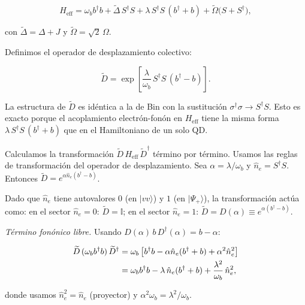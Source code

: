 \documentclass[12pt]{article}
\begin{document}
	\begin{equation}
		H_\mathrm{eff} = \omega_b b^\dagger b
		+ \widetilde\Delta\, S^\dagger S
		+ \lambda\, S^\dagger S\,(b^\dagger + b)
		+ \widetilde\Omega\bigl(S + S^\dagger\bigr),
		\label{eq:H_eff_II}
	\end{equation}
	
	con $\widetilde\Delta = \Delta + J$ y $\widetilde\Omega = \sqrt{2}\,\Omega$.
	
	\medskip
	\noindent
	Definimos el operador de desplazamiento colectivo:
	
	\begin{equation}
		\widetilde{D} = \exp\!\left[\frac{\lambda}{\omega_b}\,S^\dagger S
		\,(b^\dagger - b)\right].
		\label{eq:D_tilde}
	\end{equation}
	
	\noindent
	La estructura de $\widetilde{D}$ es id\'entica a la de Bin con la
	sustituci\'on $\sigma^\dagger\sigma \to S^\dagger S$. Esto es exacto
	porque el acoplamiento electr\'on-fon\'on en $H_\mathrm{eff}$ tiene
	la misma forma $\lambda\,S^\dagger S\,(b^\dagger + b)$ que en el
	Hamiltoniano de un solo QD.
	
	\medskip
	\noindent
	Calculamos la transformaci\'on $\widetilde{D}\,H_\mathrm{eff}\,\widetilde{D}^\dagger$
	t\'ermino por t\'ermino. Usamos las reglas de transformaci\'on del
	operador de desplazamiento. Sea $\alpha = \lambda/\omega_b$ y
	$\hat{n}_e = S^\dagger S$. Entonces $\widetilde{D} = e^{\alpha\hat{n}_e(b^\dagger - b)}$.
	
	\medskip
	\noindent
	Dado que $\hat{n}_e$ tiene autovalores $0$ (en $|vv\rangle$) y $1$
	(en $|\Psi_+\rangle$), la transformaci\'on act\'ua como:
	en el sector $\hat{n}_e = 0$: $\widetilde{D} = \mathbb{I}$; en el sector
	$\hat{n}_e = 1$: $\widetilde{D} = D(\alpha) \equiv e^{\alpha(b^\dagger - b)}$.
	
	\medskip
	\noindent
	\textit{T\'ermino fon\'onico libre.}
	Usando $D(\alpha)\,b\,D^\dagger(\alpha) = b - \alpha$:
	
	\begin{align}
		\widetilde{D}\,(\omega_b b^\dagger b)\,\widetilde{D}^\dagger
		&= \omega_b\left[b^\dagger b
		- \alpha\hat{n}_e(b^\dagger + b) + \alpha^2\hat{n}_e^2\right]
		\notag\\
		&= \omega_b b^\dagger b
		- \lambda\,\hat{n}_e(b^\dagger + b)
		+ \frac{\lambda^2}{\omega_b}\,\hat{n}_e^2,
		\label{eq:D_fon}
	\end{align}
	
	donde usamos $\hat{n}_e^2 = \hat{n}_e$ (proyector) y $\alpha^2\omega_b = \lambda^2/\omega_b$.
	
\end{document}
